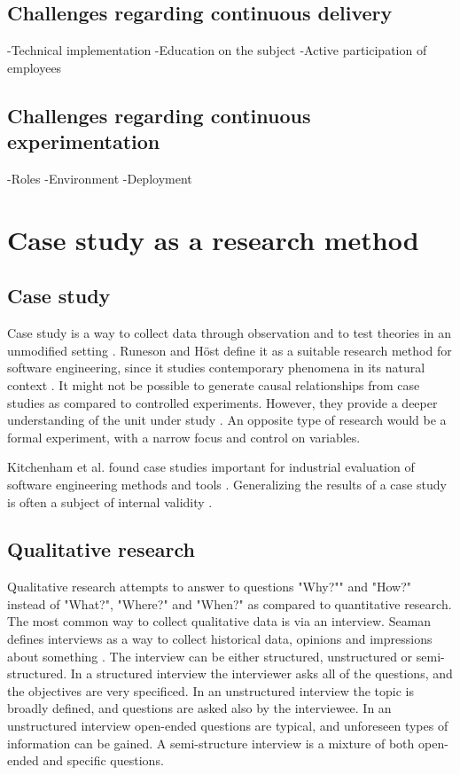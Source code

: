 \documentclass[english]{tktltiki2}
\theoremstyle{definition}
\theoremstyle{remark}
\begin{document}
\subsection{Challenges regarding continuous delivery}
-Technical implementation
-Education on the subject
-Active participation of employees

\subsection{Challenges regarding continuous experimentation}
-Roles
-Environment
-Deployment

\section{Case study as a research method}

\subsection{Case study}
Case study is a way to collect data through observation and to test theories in an unmodified setting \cite{zelkowitz1998experimental}. Runeson and Höst define it as a suitable research method for software engineering, since it studies contemporary phenomena in its natural context \cite{runeson2009guidelines}. It might not be possible to generate causal relationships from case studies as compared to controlled experiments. However, they provide a deeper understanding of the unit under study \cite{runeson2009guidelines}. An opposite type of research would be a formal experiment, with a narrow focus and control on variables. 

Kitchenham et al. found case studies important for industrial evaluation of software engineering methods and tools \cite{kitchenham1995case}. 
Generalizing the results of a case study is often a subject of internal validity \cite{kitchenham2002preliminary}. 

\subsection{Qualitative research}
Qualitative research attempts to answer to questions "Why?"" and "How?" instead of "What?", "Where?" and "When?" as compared to quantitative research. The most common way to collect qualitative data is via an interview. Seaman defines interviews as a way to collect historical data, opinions and impressions about something \cite{seaman1999qualitative}. The interview can be either structured, unstructured or semi-structured. In a structured interview the interviewer asks all of the questions, and the objectives are very specificed. In an unstructured interview the topic is broadly defined, and questions are asked also by the interviewee. In an unstructured interview open-ended questions are typical, and unforeseen types of information can be gained. A semi-structure interview is a mixture of both open-ended and specific questions. 
\end{document}
